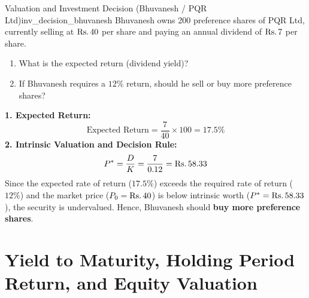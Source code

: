 \begin{example}{Valuation and Investment Decision (Bhuvanesh / PQR Ltd)}{inv_decision_bhuvanesh}
Bhuvanesh owns 200 preference shares of PQR Ltd, currently selling at $\text{Rs.}\, 40$ per share and paying an annual dividend of $\text{Rs.}\, 7$ per share.
\begin{enumerate}[leftmargin=*, noitemsep]
    \item What is the expected return (dividend yield)?
    \item If Bhuvanesh requires a $12\%$ return, should he sell or buy more preference shares?
\end{enumerate}
\tcblower
\textbf{1. Expected Return:}
\begin{equation*}
    \text{Expected Return} = \frac{7}{40} \times 100 = 17.5\%
\end{equation*}
\textbf{2. Intrinsic Valuation and Decision Rule:}
\begin{equation*}
    P^* = \frac{D}{K} = \frac{7}{0.12} = \text{Rs.}\, 58.33
\end{equation*}
Since the expected rate of return ($17.5\%$) exceeds the required rate of return ($12\%$) and the market price ($P_0 = \text{Rs.}\, 40$) is below intrinsic worth ($P^* = \text{Rs.}\, 58.33$), the security is undervalued. Hence, Bhuvanesh should \textbf{buy more preference shares}.
\end{example}

\section{Yield to Maturity, Holding Period Return, and Equity Valuation}

